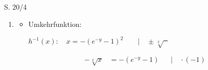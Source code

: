 \begin{Exercise}{S. 20/4}{}
\begin{enumerate}[leftmargin=*]
{\begin{enumerate}[label=\alph*), leftmargin=*]
{\begin{itemize}[leftmargin=*]
{                        }
                    \item Tangentengleichung: \\[2.0ex]{
                        $f_{T}(x): \quad y = m \cdot x + t; \qquad m = \left(h^{-1}(x)\right)'; \qquad \left(h^{-1}(x)\right)' = \dfrac{1}{h'\left(h^{-1}(x)\right)}$\\[2.0ex]
                        $Q$ in $f_{T}$: \\[-2.0ex]
                        \begin{align*}
                            \ln(3) &= \dfrac{1}{h'\left(h^{-1}(-\dfrac{4}{9})\right)} \cdot \left(-\dfrac{4}{9}\right) + t &&\\[1.5ex]
                            \ln(3) &= \dfrac{1}{h'\left(\ln(3)\right)} \cdot \left(-\dfrac{4}{9}\right) + t &&\\[1.5ex]
                            \ln(3) &= \dfrac{1}{2 \cdot \left(e^{-\ln(3)} -1\right) \cdot e^{-\ln(3)}} \cdot \left(-\dfrac{4}{9}\right) + t &&\\[1.5ex]
                            \ln(3) &= \dfrac{1}{2 \cdot \left(\dfrac{1}{3} -1\right) \cdot \dfrac{1}{3}} \cdot \left(-\dfrac{4}{9}\right) + t &&\\[1.5ex]
                            \ln(3) &= - \dfrac{9}{4} \cdot \left(-\dfrac{4}{9}\right) + t &&\\[1.5ex]
                            \ln(3) &= 1 + t &&| \quad -1\\[1.5ex]
                            t &= \ln(3) - 1 &&
                        \end{align*}\\[-2.0ex]
                        $\Rightarrow \quad \uuline{f_{T}(x) = -\dfrac{9}{4} \cdot x + \ln(3) -1}$\\
                        }
                \end{itemize}
                }
            \item[b)] {
                \begin{itemize}[leftmargin=*]
                    \item Umkehrfunktion: \\[2.0ex]{
                        $h^{-1}(x): \quad x = -\left(e^{-y} - 1\right)^{2} \qquad | \quad \pm \sqrt[2]{\phantom{x}}$\\
                        \begin{minipage}[t]{0.45\linewidth}
                            \begin{align*}
                                -\sqrt[2]{x} &= -\left(e^{-y} - 1\right) &&| \quad \cdot (-1)\\[1.5ex]

\end{align*}
\end{minipage}}
\end{itemize}}
\end{enumerate}}
\end{enumerate}
\end{Exercise}
